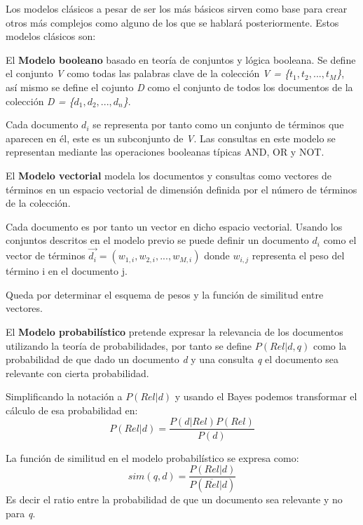 Los modelos clásicos a pesar de ser los más básicos sirven como base para crear otros más complejos como alguno de los que se hablará posteriormente. Estos modelos clásicos son:\cite{RIspaBook}

\begin{list}{}{}
\item  El \textbf{Modelo booleano} basado en teoría de conjuntos y lógica booleana. Se define el conjunto \textit{V} como todas las palabras clave de la colección \textit{V = \{\(t_1, t_2, ..., t_M\)\}}, así mismo se define el cojunto \textit{D} como el conjunto de todos los documentos de la colección \textit{D = \{\(d_1, d_2, ..., d_n\)\}}. 

Cada documento \(d_i\) se representa por tanto como un conjunto de términos que aparecen en él, este es un subconjunto de \textit{V}. Las consultas en este modelo se representan mediante las operaciones booleanas típicas AND, OR y NOT.

\item El \textbf{Modelo vectorial} modela los documentos y consultas como vectores de términos en un espacio vectorial de dimensión definida por el número de términos de la colección. 
 
Cada documento es por tanto un vector en dicho espacio vectorial. Usando los conjuntos descritos en el modelo previo se puede definir un documento \(d_i\) como el vector de términos \(\vec{d_i} = (w_{1,i}, w_{2,i}, ..., w_{M,i})\) donde \(w_{i,j}\) representa el peso del término i en el documento j.

Queda por determinar el esquema de pesos y la función de similitud entre vectores.

\item El \textbf{Modelo probabilístico} pretende expresar la relevancia de los documentos utilizando la teoría de probabilidades, por tanto se define \(P(Rel|d, q)\) como la probabilidad de que dado un documento \textit{d} y una consulta \textit{q} el documento sea relevante con cierta probabilidad. 

Simplificando la notación a $P(Rel|d)$ y usando el \gls{Bayes} podemos transformar el cálculo de esa probabilidad en:
\begin{equation}
P(Rel|d) = \frac{P(d|Rel)P(Rel)}{P(d)}
\end{equation}


La función de similitud en el modelo probabilístico se expresa como:
\begin{equation}
sim(q,d) = \frac{P(Rel|d)}{P(\overline{Rel}|d)}
\end{equation}
Es decir el ratio entre la probabilidad de que un documento sea relevante y no para \textit{q}. 


\end{list}

